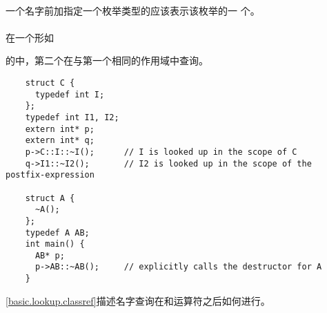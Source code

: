 \paragraph{} %
一个名字前加指定一个枚举类型的应该表示该枚举的一
个\enumr{}。

\paragraph{} %
在一个形如\par
\mbox\qquad{} \tm{::\tat}
  \par
的中，第二个在与第一个相同的作用域中查询。

\begin{example}
  \begin{lstlisting}
    struct C {
      typedef int I;
    };
    typedef int I1, I2;
    extern int* p;
    extern int* q;
    p->C::I::~I();      // I is looked up in the scope of C
    q->I1::~I2();       // I2 is looked up in the scope of the postfix-expression

    struct A {
      ~A();
    };
    typedef A AB;
    int main() {
      AB* p;
      p->AB::~AB();     // explicitly calls the destructor for A
    }
  \end{lstlisting}
\end{example}

\begin{note}
  \ref{basic.lookup.classref}描述名字查询在和\tm{->}运算符之后如何进行。
\end{note}
